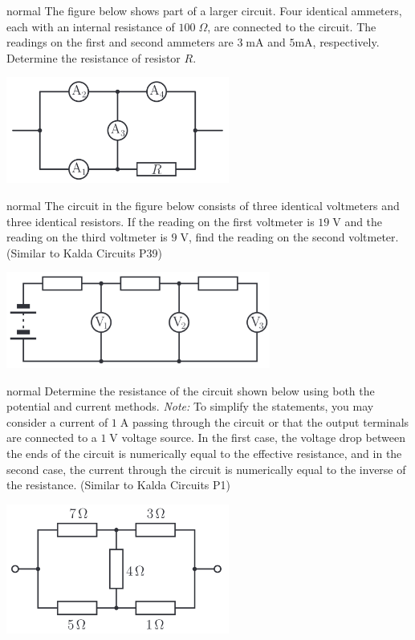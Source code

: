 \hypertarget{P8}{}
\begin{solution}{normal} %
The figure below shows part of a larger circuit. Four identical ammeters, each with an internal resistance of $100\;\Omega$, are connected to the circuit. The readings on the first and second ammeters are $3\;\text{mA}$ and $\text{5mA}$, respectively. Determine the resistance of resistor $R$.
\begin{center}
    \includegraphics[width=0.55\textwidth]{S1 Figures/S1-8.png}
\end{center}
\end{solution}

\hypertarget{P9}{}
\begin{solution}{normal} %
The circuit in the figure below consists of three identical voltmeters and three identical resistors. If the reading on the first voltmeter is $19\;\text{V}$ and the reading on the third voltmeter is $9\;\text{V}$, find the reading on the second voltmeter. (Similar to Kalda Circuits P39)
\begin{center}
    \includegraphics[width=0.65\textwidth]{S1 Figures/S1-9.png}
\end{center}
\end{solution}

\hypertarget{P10}{}
\begin{solution}{normal} %
Determine the resistance of the circuit shown below using both the potential and current methods. \textit{Note:} To simplify the statements, you may consider a current of $1\;\text{A}$ passing through the circuit or that the output terminals are connected to a $1\;\text{V}$ voltage source. In the first case, the voltage drop between the ends of the circuit is numerically equal to the effective resistance, and in the second case, the current through the circuit is numerically equal to the inverse of the resistance. (Similar to Kalda Circuits P1)
\begin{center}
    \includegraphics[width=0.55\textwidth]{S1 Figures/S1-10.png}
\end{center}
\end{solution}

